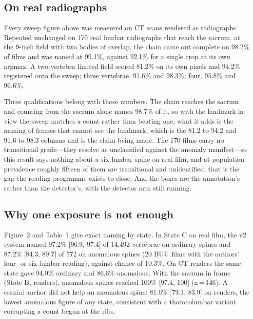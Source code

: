 \documentclass[11pt,letterpaper]{article}
\newcommand{\ci}[2]{[#1, #2]}
\begin{document}
\subsection*{On real radiographs}
Every sweep figure above was measured on CT scans rendered as radiographs. Repeated unchanged on 170 real lumbar radiographs that reach the sacrum, at the 9-inch field with two bodies of overlap, the chain came out complete on 98.2\% of films and was named at 99.1\%, against 92.1\% for a single crop at its own argmax. A two-vertebra limited field scored 81.2\% on its own pixels and 94.2\% registered onto the sweep; three vertebrae, 91.6\% and 98.3\%; four, 95.8\% and 96.6\%.

Three qualifications belong with those numbers. The chain reaches the sacrum and counting from the sacrum alone names 98.7\% of it, so with the landmark in view the sweep matches a count rather than beating one; what it adds is the naming of frames that cannot see the landmark, which is the 81.2 to 94.2 and 91.6 to 98.3 columns and is the claim being made. The 170 films carry no transitional grade---they resolve as unclassified against the anomaly manifest---so this result says nothing about a six-lumbar spine on real film, and at population prevalence roughly fifteen of them are transitional and unidentified; that is the gap the reading programme exists to close. And the boxes are the annotation's rather than the detector's, with the detector arm still running.

\subsection*{Why one exposure is not enough}
Figure~2 and Table~1 give exact naming by state. In State C on real film, the v2 system named 97.2\% \ci{96.9}{97.4} of 14,492 vertebrae on ordinary spines and 87.2\% \ci{84.3}{89.7} of 572 on anomalous spines (20 BUU films with the authors' four- or six-lumbar reading), against chance of 10.3\%. On CT renders the same state gave 94.0\% ordinary and 86.6\% anomalous. With the sacrum in frame (State B, renders), anomalous spines reached 100\% \ci{97.4}{100} (n\,=\,146). A cranial anchor did not help an anomalous spine: 81.6\% \ci{79.1}{83.9} on renders, the lowest anomalous figure of any state, consistent with a thoracolumbar variant corrupting a count begun at the ribs.
\end{document}
